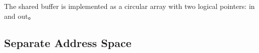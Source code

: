 The shared buffer is implemented as a circular array with two logical pointers:
in and out。








% 



\subsection{Separate Address Space}
